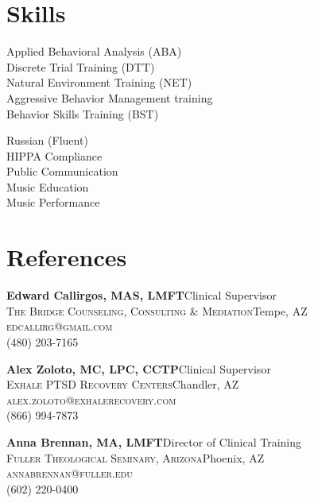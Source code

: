 \documentclass[letterpaper,11pt]{article}
\newcommand{\flstyle}{\textbf}
\newcommand{\slstyle}{\normalsize\textsc}
\newcommand{\locstyle}{\textnormal}
\newcommand{\refcon}[6]{
\begin{minipage}[t]{1\textwidth}
	\flstyle{#1}\hfill\locstyle{#2}\\
	\slstyle{#3}\hfill\locstyle{#4}\\
	\slstyle{#5}\\
	\slstyle{#6}
	\end{minipage}
	\vspace{1em}
}
\begin{document}
\section{Skills}%
\vspace{.7em}
\begin{minipage}[t]{.48\textwidth}\scshape
\begin{spacing}{1.5}
Applied Behavioral Analysis (ABA)\\
Discrete Trial Training (DTT)\\
Natural Environment Training (NET)\\
Aggressive Behavior Management training\\
Behavior Skills Training (BST)
\end{spacing}
\end{minipage}
\hspace{.20\textwidth}
\begin{minipage}[t]{.30\textwidth}\scshape
\begin{spacing}{1.5}
Russian (Fluent)\\
HIPPA Compliance\\
Public Communication\\
Music Education\\
Music Performance
\end{spacing}
\end{minipage}\scshape
\vspace{-0.8cm}
\vspace{2em}
\section{References}%
\vspace{1em}
\refcon{Edward Callirgos, MAS, LMFT}{Clinical Supervisor}{The Bridge Counseling, Consulting \& Mediation}{Tempe, AZ}{edcallirg@gmail.com}{(480) 203-7165}

\refcon{Alex Zoloto, MC, LPC, CCTP}{Clinical Supervisor}{Exhale PTSD Recovery Centers}{Chandler, AZ}{alex.zoloto@exhalerecovery.com}{(866) 994-7873}

\refcon{Anna Brennan, MA, LMFT}{Director of Clinical Training}{Fuller Theological Seminary, Arizona}{Phoenix, AZ}{annabrennan@fuller.edu}{(602) 220-0400}
\end{document}
